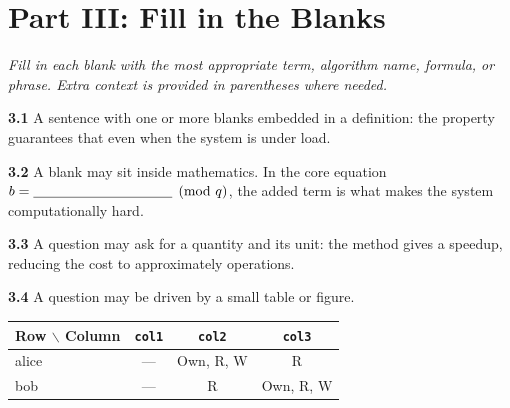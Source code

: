 %
%

\section*{Part III: Fill in the Blanks}
\textit{Fill in each blank with the most appropriate term, algorithm name,
formula, or phrase. Extra context is provided in parentheses where needed.}

\vspace{4mm}

\textbf{3.1}
A sentence with one or more blanks embedded in a definition:
the \blank{3cm} property guarantees that \blank{3cm}
even when the system is under load.

\vspace{4mm}

\textbf{3.2}
A blank may sit inside mathematics. In the core equation
$b = \blank{3.5cm} \pmod{q}$, the added term \blank{3cm}
is what makes the system computationally hard.

\vspace{4mm}

\textbf{3.3}
A question may ask for a quantity and its unit:
the method gives a \blank{3cm} speedup, reducing the cost to
approximately \blank{2cm} operations.

\vspace{4mm}

\textbf{3.4}
A question may be driven by a small table or figure.

\vspace{2mm}
\begin{center}
\begin{tabular}{|l|c|c|c|}
\hline
\textbf{Row $\backslash$ Column} & \texttt{col1} & \texttt{col2} & \texttt{col3} \\
\hline
alice & --- & Own, R, W & R \\
\hline
bob   & --- & R         & Own, R, W \\
\hline
\end{tabular}
\end{center}
\vspace{2mm}


